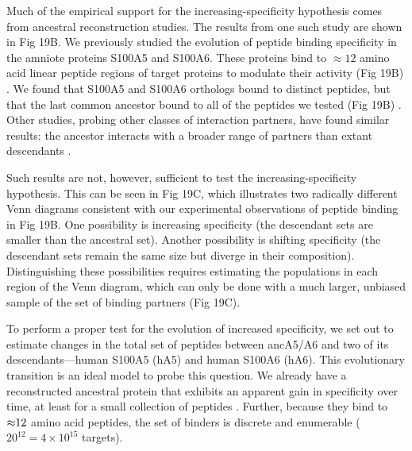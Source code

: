 Much of the empirical support for the increasing-specificity hypothesis
comes from ancestral reconstruction studies. The results from one
such study are shown in Fig 19B. We previously studied the evolution
of peptide binding specificity in the amniote proteins S100A5 and
S100A6. These proteins bind to $\approx12$ amino acid linear peptide
regions of target proteins to modulate their activity (Fig 19B) \citep{santamaria-kisiel_calcium-dependent_2006,lee_structure_2008,bertini_solution_2009,leclerc_binding_2009,lesniak_s100a6_2009,streicher_annexin_2009,slomnicki_s100a6_2009,liriano_structure_2012,donato_functions_2013}.
We found that S100A5 and S100A6 orthologs bound to distinct peptides,
but that the last common ancestor bound to all of the peptides we
tested (Fig 19B) \citep{wheeler_conservation_2017}. Other studies,
probing other classes of interaction partners, have found similar
results: the ancestor interacts with a broader range of partners than
extant descendants \citep{carroll_evolution_2008,eick_evolution_2012,risso_hyperstability_2013,pougach_duplication_2014,risso_thermostable_2014,zou_evolution_2015,clifton_ancestral_2016,devamani_catalytic_2016,ma_molecular_2016,rauwerdink_evolution_2016,alhindi_protein_2017,wheeler_conservation_2017}. 

Such results are not, however, sufficient to test the increasing-specificity
hypothesis. This can be seen in Fig 19C, which illustrates two radically
different Venn diagrams consistent with our experimental observations
of peptide binding in Fig 19B. One possibility is increasing specificity
(the descendant sets are smaller than the ancestral set). Another
possibility is shifting specificity (the descendant sets remain the
same size but diverge in their composition). Distinguishing these
possibilities requires estimating the populations in each region of
the Venn diagram, which can only be done with a much larger, unbiased
sample of the set of binding partners (Fig 19C).  

To perform a proper test for the evolution of increased specificity,
we set out to estimate changes in the total set of peptides between
ancA5/A6 and two of its descendants---human S100A5 (hA5) and human S100A6
(hA6). This evolutionary transition is an ideal model to probe this
question. We already have a reconstructed ancestral protein that exhibits
an apparent gain in specificity over time, at least for a small collection
of peptides \citep{wheeler_conservation_2017}. Further, because they
bind to $\text{\ensuremath{\approx}}12$ amino acid peptides, the
set of binders is discrete and enumerable ($20^{12}=4\times10^{15}$
targets). 

